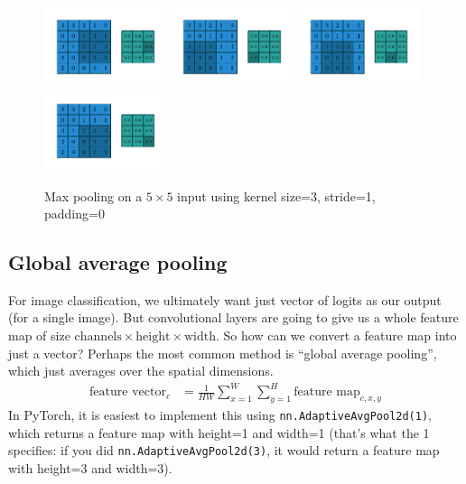 \documentclass{article}
\begin{document}
\begin{figure}[H]
    \includegraphics[width=0.32\textwidth]{pdf/numerical_max_pooling_05.pdf}
    \includegraphics[width=0.32\textwidth]{pdf/numerical_max_pooling_06.pdf}
    \includegraphics[width=0.32\textwidth]{pdf/numerical_max_pooling_07.pdf}
    \includegraphics[width=0.32\textwidth]{pdf/numerical_max_pooling_08.pdf}
    \caption{\label{fig:numerical_max_pooling} Max pooling on a $5 \times 5$ input using kernel size=3, stride=1, padding=0}
\end{figure}

\subsection{Global average pooling}

For image classification, we ultimately want just vector of logits as our output (for a single image).
But convolutional layers are going to give us a whole feature map of size $\text{channels} \times \text{height} \times \text{width}$.
So how can we convert a feature map into just a vector?
Perhaps the most common method is ``global average pooling'', which just averages over the spatial dimensions.
\begin{align}
  \text{feature vector}_c &= \tfrac{1}{HW} \sum_{x=1}^W \sum_{y=1}^H \text{feature map}_{c, x, y}
\end{align}
In PyTorch, it is easiest to implement this using \verb|nn.AdaptiveAvgPool2d(1)|, which returns a feature map with height=1 and width=1 (that's what the 1 specifies: if you did \verb|nn.AdaptiveAvgPool2d(3)|, it would return a feature map with height=3 and width=3).
\end{document}
